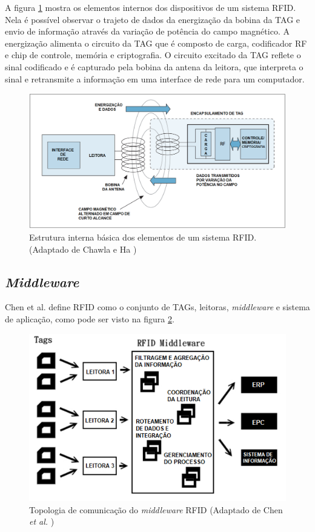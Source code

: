 A figura \ref{fig:DetalhesRFID} mostra os elementos internos dos dispositivos de um sistema RFID. Nela é possível observar o trajeto de dados da energização da bobina da TAG e envio de informação através da variação de potência do campo magnético. A energização alimenta o circuito da TAG que é composto de carga, codificador RF e chip de controle, memória e criptografia. O circuito excitado da TAG reflete o sinal codificado e é capturado pela bobina da antena da leitora, que interpreta o sinal e retransmite a informação em uma interface de rede para um computador.

\begin{figure}[h]
    \centering
    \includegraphics[width=0.8\linewidth]{figs/Fundamentos/RFIDdetails.png}
    \caption{Estrutura interna básica dos elementos de um sistema RFID. (Adaptado de Chawla e Ha \cite{chawla2007overview})}
    \label{fig:DetalhesRFID}
\end{figure}

\subsection{\textit{Middleware}} \label{section: middleware}

Chen et al. \cite{chenUsingRFID} define RFID como o conjunto de TAGs, leitoras, \textit{middleware} e sistema de aplicação, como pode ser visto na figura \ref{fig:RFID-Middleware}.

\begin{figure}[h]
    \centering
    \includegraphics[width=0.6\linewidth]{figs/Fundamentos/RFID.png}
    \caption{Topologia de comunicação do \textit{middleware} RFID (Adaptado de Chen \textit{et al.} \cite{chenUsingRFID})}
    \label{fig:RFID-Middleware}
\end{figure}

